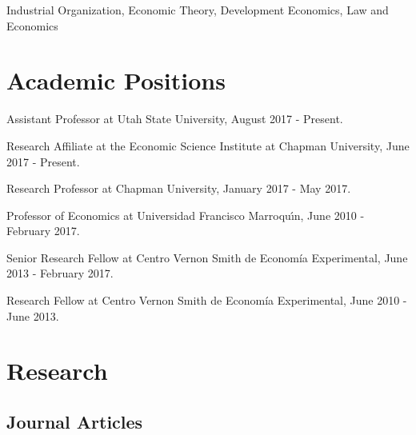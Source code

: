 \documentclass{article}%
\renewenvironment{itemize}{
\begin{list}{}{
\setlength{\leftmargin}{1.5em}
}
}{
\end{list}
}
\begin{document}
Industrial Organization, Economic Theory, Development Economics, Law and Economics

\section*{Academic Positions}

\begin{itemize}
\item Assistant Professor at Utah State University, August 2017 - Present.
\item Research Affiliate at the Economic Science Institute at Chapman University, June 2017 - Present.
\item Research Professor at Chapman University, January 2017 - May 2017.
\item Professor of Economics at Universidad Francisco Marroqu\'{\i}n, June 2010 - February 2017.
\item Senior Research Fellow at Centro Vernon Smith de Econom\'{i}a Experimental, June 2013 - February 2017. 
\item Research Fellow at Centro Vernon Smith de Econom\'{i}a Experimental, June 2010 - June 2013. 
\end{itemize}

\section*{Research}

\subsection*{Journal Articles}
\end{document}
